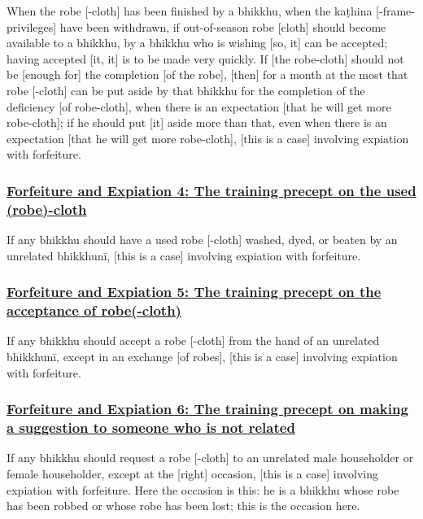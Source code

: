 When the robe [-cloth] has been finished by a bhikkhu, when the kaṭhina [-frame-privileges] have been withdrawn, if out-of-season robe [cloth] should become available to a bhikkhu, by a bhikkhu who is wishing [so, it] can be accepted; having accepted [it, it] is to be made very quickly. If [the robe-cloth] should not be [enough for] the completion [of the robe], [then] for a month at the most that robe [-cloth] can be put aside by that bhikkhu for the completion of the deficiency [of robe-cloth], when there is an expectation [that he will get more robe-cloth]; if he should put [it] aside more than that, even when there is an expectation [that he will get more robe-cloth], [this is a case] involving expiation with forfeiture.



\subsubsection*{\hyperref[np4]{Forfeiture and Expiation 4: The training precept on the used (robe)-cloth}}
\label{forf-exp4}

If any bhikkhu should have a used robe [-cloth] washed, dyed, or beaten by an unrelated bhikkhunī, [this is a case] involving expiation with forfeiture.



\subsubsection*{\hyperref[np5]{Forfeiture and Expiation 5: The training precept on the acceptance of robe(-cloth)}}
\label{forf-exp5}

If any bhikkhu should accept a robe [-cloth] from the hand of an unrelated bhikkhunī, except in an exchange [of robes], [this is a case] involving expiation with forfeiture.



\subsubsection*{\hyperref[np6]{Forfeiture and Expiation 6: The training precept on making a suggestion to someone who is not related}}
\label{forf-exp6}

If any bhikkhu should request a robe [-cloth] to an unrelated male householder or female householder, except at the [right] occasion, [this is a case] involving expiation with forfeiture. Here the occasion is this: he is a bhikkhu whose robe has been robbed or whose robe has been lost; this is the occasion here.



